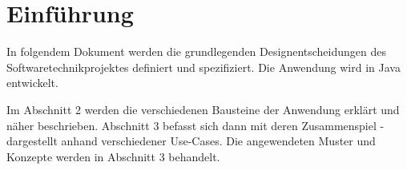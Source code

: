 \chapter{Einführung}
In folgendem Dokument werden die grundlegenden Designentscheidungen des Softwaretechnikprojektes 
definiert und spezifiziert. Die Anwendung wird in Java entwickelt.

Im Abschnitt 2 werden die verschiedenen Bausteine der Anwendung erklärt und näher beschrieben. 
Abschnitt 3 befasst sich dann mit deren Zusammenspiel - dargestellt anhand verschiedener Use-Cases. 
Die angewendeten Muster und Konzepte werden in Abschnitt 3 behandelt.
